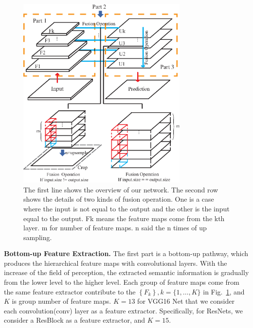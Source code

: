 \begin{figure}
\centering
\includegraphics[width=8.5cm]{Figures/Fusion_Operation.eps}
\caption{The first line shows the overview of our network. The second row shows the details of two kinds of fusion operation. One is a case where the input is not equal to the output and the other is the input equal to the output. Fk means the feature maps come from the kth layer. m for number of feature maps. n said the n times of up sampling.}
\label{fig:Fusion-Operation}
\end{figure} 

\noindent\textbf{Bottom-up Feature Extraction.} The first part is a bottom-up pathway, which produces the hierarchical feature maps with convolutional layers. 
%
With the increase of the field of perception, the extracted semantic information is gradually from the lower level to the higher level. 
Each group of feature maps come from the same feature extractor contribute to the $\left\{F_{k}\right\},k=\{1,\ldots,K\}$ in Fig.~\ref{fig:Fusion-Operation}, and ${K}$ is group number of feature maps.
${K}=13$ for VGG16 Net that we consider each convolution(conv) layer as a feature extractor. 
Specifically, for ResNets, we consider a ResBlock as a feature extractor, and ${K}=15$.


